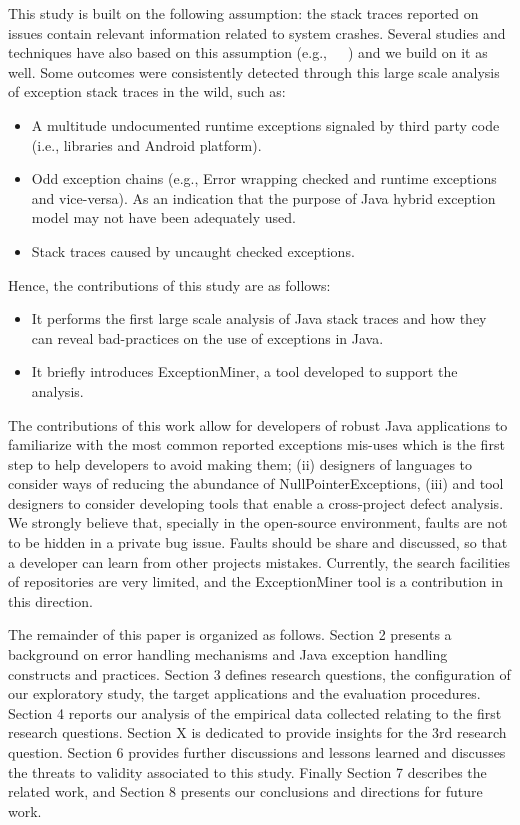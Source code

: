 \documentclass[conference]{IEEEtran}
\begin{document}
This study is built on the following assumption: the stack traces reported on issues contain relevant information related to system crashes. Several studies and techniques have also based on this assumption (e.g.,~\cite{sinha2009fault}~\cite{dhaliwal2011classifying}~\cite{kim2013predicting}) and we build on it as well. Some outcomes were consistently detected through this large scale analysis of exception stack traces in the wild, such as:

\begin{itemize}
\item  A multitude undocumented runtime exceptions signaled by third party code (i.e., libraries and Android platform).
\item  Odd exception chains (e.g., Error wrapping checked and runtime exceptions and vice-versa). As an indication that the purpose of Java hybrid exception model may not have been adequately used.
\item  Stack traces caused by uncaught checked exceptions.
\end{itemize}
 
Hence, the contributions of this study are as follows:
\begin{itemize}
\item  It performs the first large scale analysis of Java stack traces and how they can reveal bad-practices on the use of exceptions in Java. 
\item  It briefly introduces ExceptionMiner, a tool developed to support the analysis.
\end{itemize}


The contributions of this work allow for developers of robust Java applications to familiarize with the most common reported exceptions mis-uses which is the first step to help developers to avoid making them; (ii) designers of languages to consider ways of reducing the abundance of NullPointerExceptions, (iii) and tool designers to consider developing tools that enable a cross-project defect analysis. We strongly believe that, specially in the open-source environment, faults are not to be hidden in a private bug issue. Faults should be share and discussed, so that a developer can learn from other projects mistakes. Currently, the search facilities of repositories are very limited, and the ExceptionMiner tool is a contribution in this direction.

The remainder of this paper is organized as follows. Section 2 presents a background on error handling mechanisms and Java exception handling constructs and practices. Section 3 defines research questions, the configuration of our exploratory study, the target applications and the evaluation procedures. Section 4 reports our analysis of the empirical data collected relating to the first research questions. Section X is dedicated to provide insights for the 3rd research question. Section 6 provides further discussions and lessons learned and discusses the threats to validity associated to this study. Finally Section 7 describes the related work, and Section 8 presents our conclusions and directions for future work. 
\end{document}
